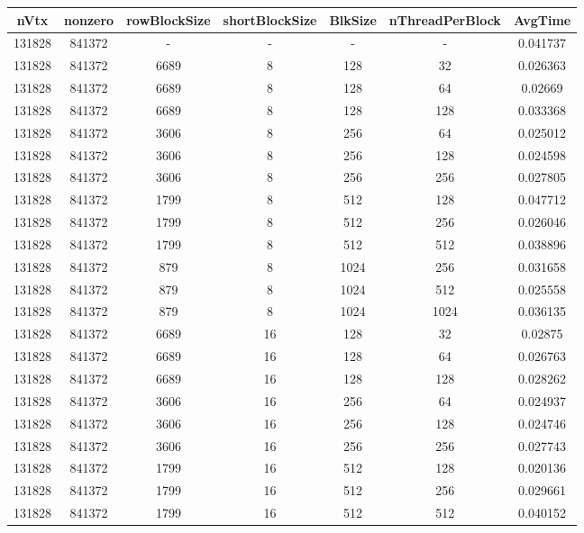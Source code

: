 \documentclass[9pt]{article}
\begin{document}
\SetBgPosition{0.25cm,-5.0cm}
\begin{tabular}{|c|c|c|c|c|c|c| }  
\hline
nVtx  & nonzero  & rowBlockSize  & shortBlockSize  & BlkSize  & nThreadPerBlock  & AvgTime \\
\hline
131828  & 841372  &  -  & -  & -  & -  &0.041737 \\
\hline
131828  & 841372  & 6689  & 8  & 128  & 32  & 0.026363 \\
\hline
131828  & 841372  & 6689  & 8  & 128  & 64  & 0.02669 \\
\hline
131828  & 841372  & 6689  & 8  & 128  & 128  & 0.033368 \\
\hline
131828  & 841372  & 3606  & 8  & 256  & 64  & 0.025012 \\
\hline
131828  & 841372  & 3606  & 8  & 256  & 128  & 0.024598 \\
\hline
131828  & 841372  & 3606  & 8  & 256  & 256  & 0.027805 \\
\hline
131828  & 841372  & 1799  & 8  & 512  & 128  & 0.047712 \\
\hline
131828  & 841372  & 1799  & 8  & 512  & 256  & 0.026046 \\
\hline
131828  & 841372  & 1799  & 8  & 512  & 512  & 0.038896 \\
\hline
131828  & 841372  & 879  & 8  & 1024  & 256  & 0.031658 \\
\hline
131828  & 841372  & 879  & 8  & 1024  & 512  & 0.025558 \\
\hline
131828  & 841372  & 879  & 8  & 1024  & 1024  & 0.036135 \\
\hline
131828  & 841372  & 6689  & 16  & 128  & 32  & 0.02875 \\
\hline
131828  & 841372  & 6689  & 16  & 128  & 64  & 0.026763 \\
\hline
131828  & 841372  & 6689  & 16  & 128  & 128  & 0.028262 \\
\hline
131828  & 841372  & 3606  & 16  & 256  & 64  & 0.024937 \\
\hline
131828  & 841372  & 3606  & 16  & 256  & 128  & 0.024746 \\
\hline
131828  & 841372  & 3606  & 16  & 256  & 256  & 0.027743 \\
\hline
131828  & 841372  & 1799  & 16  & 512  & 128  & 0.020136 \\
\hline
131828  & 841372  & 1799  & 16  & 512  & 256  & 0.029661 \\
\hline
131828  & 841372  & 1799  & 16  & 512  & 512  & 0.040152 \\

\end{tabular}
\end{document}
